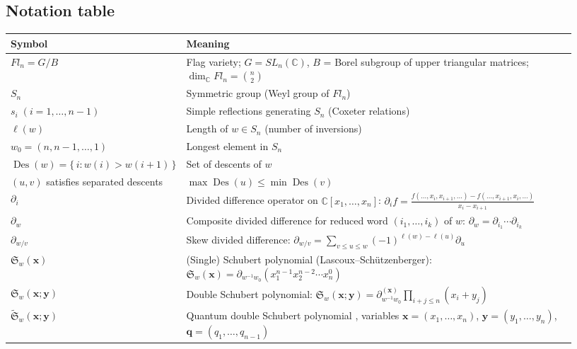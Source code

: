 \documentclass[12pt]{amsart}
\begin{document}
\subsection{Notation table}
\begin{center}
\begin{tabular}{p{0.22\linewidth}p{0.71\linewidth}}
\toprule
\textbf{Symbol} & \textbf{Meaning} \\
\midrule
$Fl_n = G/B$ & Flag variety; $G = SL_n(\mathbb{C})$, $B$ = Borel subgroup of upper triangular matrices; $\dim_{\mathbb{C}} Fl_n = \binom{n}{2}$ \\
\addlinespace
$S_n$ & Symmetric group (Weyl group of $Fl_n$) \\
\addlinespace
$s_i\;(i=1,\ldots,n-1)$ & Simple reflections generating $S_n$ (Coxeter relations) \\
\addlinespace
$\ell(w)$ & Length of $w\in S_n$ (number of inversions) \\
\addlinespace
$w_0 = (n,n-1,\ldots,1)$ & Longest element in $S_n$ \\
\addlinespace
$\operatorname{Des}(w) = \{\,i : w(i)>w(i+1)\,\}$ & Set of descents of $w$ \\
\addlinespace
$(u,v)$ satisfies separated descents & $\max\operatorname{Des}(u) \le \min\operatorname{Des}(v)$ \cite[Definition 2.1]{Sa} \\
\addlinespace
$\partial_i$ & Divided difference operator on $\mathbb{C}[x_1,\ldots,x_n]$: $\displaystyle\partial_i f = \frac{f(\ldots,x_i,x_{i+1},\ldots)-f(\ldots,x_{i+1},x_i,\ldots)}{x_i-x_{i+1}}$ \\
\addlinespace
$\partial_w$ & Composite divided difference for reduced word $(i_1,\ldots,i_k)$ of $w$: $\partial_w = \partial_{i_1}\cdots\partial_{i_k}$ \\
\addlinespace
$\partial_{w/v}$ & Skew divided difference: $\displaystyle\partial_{w/v} = \sum_{v\le u\le w}(-1)^{\ell(w)-\ell(u)}\partial_u$ \\
\addlinespace
$\mathfrak{S}_w(\mathbf{x})$ & (Single) Schubert polynomial (Lascoux--Sch\"utzenberger): $\mathfrak{S}_w(\mathbf{x}) = \partial_{w^{-1}w_0}(x_1^{n-1}x_2^{n-2}\cdots x_n^0)$ \\
\addlinespace
$\mathfrak{S}_w(\mathbf{x};\mathbf{y})$ & Double Schubert polynomial: $\mathfrak{S}_w(\mathbf{x};\mathbf{y}) = \partial_{w^{-1}w_0}^{(\mathbf{x})}\prod_{i+j\le n}(x_i+y_j)$ \\
\addlinespace
$\widetilde{\mathfrak{S}}_w(\mathbf{x};\mathbf{y})$ & Quantum double Schubert polynomial \cite{KM}, variables $\mathbf{x}=(x_1,\ldots,x_n)$, $\mathbf{y}=(y_1,\ldots,y_n)$, $\mathbf{q}=(q_1,\ldots,q_{n-1})$ \\

\end{tabular}
\end{center}
\end{document}
